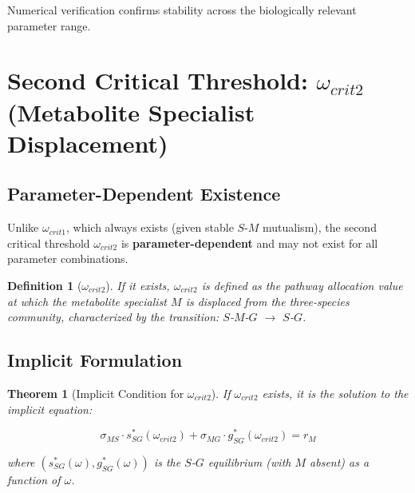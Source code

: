 \documentclass[11pt]{article}
\newtheorem{theorem}{Theorem}
\newtheorem{definition}{Definition}
\begin{document}
Numerical verification confirms stability across the biologically relevant parameter range.

\section{Second Critical Threshold: $\omega_{crit2}$ (Metabolite Specialist Displacement)}

\subsection{Parameter-Dependent Existence}

Unlike $\omega_{crit1}$, which always exists (given stable $S$-$M$ mutualism), the second critical threshold $\omega_{crit2}$ is \textbf{parameter-dependent} and may not exist for all parameter combinations.

\begin{definition}[$\omega_{crit2}$]
If it exists, $\omega_{crit2}$ is defined as the pathway allocation value at which the metabolite specialist $M$ is displaced from the three-species community, characterized by the transition: $S$-$M$-$G$ $\to$ $S$-$G$.
\end{definition}

\subsection{Implicit Formulation}

\begin{theorem}[Implicit Condition for $\omega_{crit2}$]
If $\omega_{crit2}$ exists, it is the solution to the implicit equation:

\begin{equation}
\boxed{\sigma_{MS} \cdot s^*_{SG}(\omega_{crit2}) + \sigma_{MG} \cdot g^*_{SG}(\omega_{crit2}) = r_M}
\label{eq:omega_crit2_implicit}
\end{equation}

where $(s^*_{SG}(\omega), g^*_{SG}(\omega))$ is the $S$-$G$ equilibrium (with $M$ absent) as a function of $\omega$.
\end{theorem}
\end{document}
